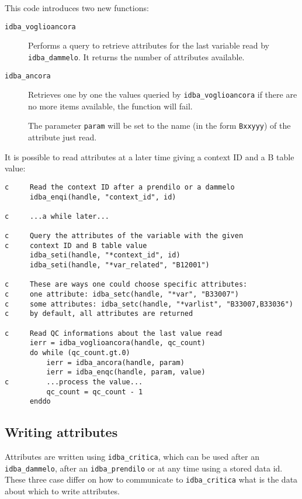 \documentclass[final,12pt,a4paper,twoside]{book}
\begin{document}
This code introduces two new functions:

\begin{description}
\item[{\tt idba\_voglioancora}]
  Performs a query to retrieve attributes for the last variable read by
  {\tt idba\_dammelo}.  It returns the number of attributes available.
\item[{\tt idba\_ancora}]
  Retrieves one by one the values queried by {\tt idba\_voglioancora} if
  there are no more items available, the function will fail.

  The parameter {\tt param} will be set to the name (in the form {\tt *Bxxyyy}) of
  the attribute just read.
\end{description}

It is possible to read attributes at a later time giving a context ID and a B
table value:

\begin{verbatim}
c     Read the context ID after a prendilo or a dammelo
      idba_enqi(handle, "context_id", id)

c     ...a while later...

c     Query the attributes of the variable with the given
c     context ID and B table value
      idba_seti(handle, "*context_id", id)
      idba_seti(handle, "*var_related", "B12001")

c     These are ways one could choose specific attributes:
c     one attribute: idba_setc(handle, "*var", "B33007")
c     some attributes: idba_setc(handle, "*varlist", "B33007,B33036")
c     by default, all attributes are returned

c     Read QC informations about the last value read
      ierr = idba_voglioancora(handle, qc_count)
      do while (qc_count.gt.0)
          ierr = idba_ancora(handle, param) 
          ierr = idba_enqc(handle, param, value)
c         ...process the value...
          qc_count = qc_count - 1
      enddo
\end{verbatim}

\subsection{Writing attributes}

\label{fun-idba_critica}

Attributes are written using {\tt idba\_critica}, which can be used after an
{\tt idba\_dammelo}, after an {\tt idba\_prendilo} or at any time using a stored data
id.  These three case differ on how to communicate to {\tt idba\_critica} what is
the data about which to write attributes.
\end{document}
